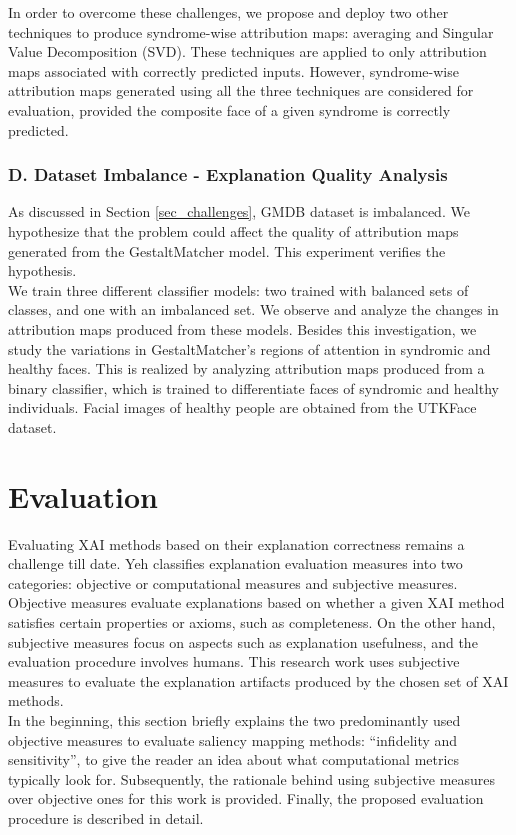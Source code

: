 \documentclass[../report.tex]{subfiles}
\begin{document}
    In order to overcome these challenges, we propose and deploy two other techniques to produce syndrome-wise attribution maps: averaging and Singular Value Decomposition (SVD). These techniques are applied to only attribution maps associated with correctly predicted inputs. However, syndrome-wise attribution maps generated using all the three techniques are considered for evaluation, provided the composite face of a given syndrome is correctly predicted.
    \subsubsection{D. Dataset Imbalance - Explanation Quality Analysis} \label{sec_data_imb}
    As discussed in Section \ref{sec_challenges}, GMDB dataset is imbalanced. We hypothesize that the problem could affect the quality of attribution maps generated from the GestaltMatcher model. This experiment verifies the hypothesis.\\
    We train three different classifier models: two trained with balanced sets of classes, and one with an imbalanced set. We observe and analyze the changes in attribution maps produced from these models. Besides this investigation, we study the variations in GestaltMatcher's regions of attention in syndromic and healthy faces. This is realized by analyzing attribution maps produced from a binary classifier, which is trained to differentiate faces of syndromic and healthy individuals. Facial images of healthy people are obtained from the UTKFace dataset.
    \section{Evaluation}\label{sec_evaluation}
    Evaluating XAI methods based on their explanation correctness remains a challenge till date. Yeh \etal \cite{yeh2019fidelity} classifies explanation evaluation measures into two categories: objective or computational measures and subjective measures. Objective measures evaluate explanations based on whether a given XAI method satisfies certain properties or axioms, such as completeness\cite{sundararajan2017axiomatic}. On the other hand, subjective measures focus on aspects such as explanation usefulness, and the evaluation procedure involves humans. This research work uses subjective measures to evaluate the explanation artifacts produced by the chosen set of XAI methods.\\ 
    In the beginning, this section briefly explains the two predominantly used objective measures to evaluate saliency mapping methods: \enquote{infidelity and sensitivity}\cite{yeh2019fidelity}, to give the reader an idea about what computational metrics typically look for. Subsequently, the rationale behind using subjective measures over objective ones for this work is provided. Finally, the proposed evaluation procedure is described in detail.
\end{document}
